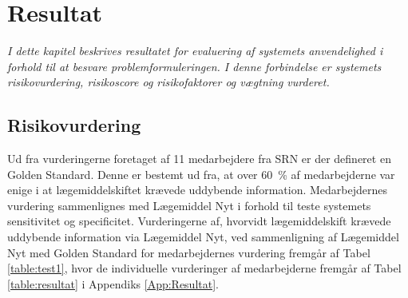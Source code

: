\chapter{Resultat}
\vspace{-0.3cm}
\textit{I dette kapitel beskrives resultatet for evaluering af systemets anvendelighed i forhold til at besvare problemformuleringen. I denne forbindelse er systemets risikovurdering, risikoscore og risikofaktorer og vægtning vurderet.}


\section{Risikovurdering}
Ud fra vurderingerne foretaget af 11 medarbejdere fra SRN er der defineret en Golden Standard. Denne er bestemt ud fra, at over 60~\% af medarbejderne var enige i at lægemiddelskiftet krævede uddybende information. Medarbejdernes vurdering sammenlignes med Lægemiddel Nyt i forhold til teste systemets sensitivitet og specificitet. Vurderingerne af, hvorvidt lægemiddelskift krævede uddybende information via Lægemiddel Nyt, ved sammenligning af Lægemiddel Nyt med Golden Standard for medarbejdernes vurdering fremgår af Tabel \ref{table:test1}, hvor de individuelle vurderinger af medarbejderne fremgår af Tabel \ref{table:resultat} i Appendiks \ref{App:Resultat}.

